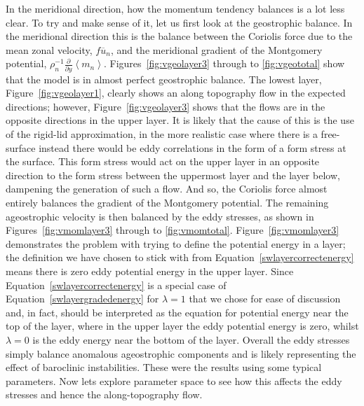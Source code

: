 \documentclass[12pt,a4paper]{report}
\newcommand*\thkmean[1]{\overline{#1}}
\newcommand*\nthkmean[1]{\left\langle{#1}\right\rangle}
\newcommand*\figref[1]{Figure~\ref{#1}}
\newcommand*\equref[1]{Equation~\eqref{#1}}
\newcommand*{\partialdiff}[2][{}]{\frac{\partial #1}{\partial #2}}
\begin{document}
 In the meridional direction, how the momentum tendency balances is a lot
 less clear. To try and make sense of it, let us first look at
 the geostrophic balance. In the meridional direction this
 is the balance between the Coriolis force due to the mean zonal velocity,
 $f\thkmean{u}_{n}$,
 and the meridional gradient of the Montgomery potential,
 $\rho_{n}^{-1}\partialdiff{y}\nthkmean{m_{n}}$. Figures~\ref{fig:vgeolayer3}
 through to \ref{fig:vgeototal} show that the model is in almost perfect
 geostrophic balance. The lowest layer, \figref{fig:vgeolayer1}, clearly shows
 an along topography flow in the expected directions; however, \figref{fig:vgeolayer3}
 shows that the flows are in the opposite directions in the upper layer. 
 It is likely that the cause of this is the use of the rigid-lid approximation,
 in the more realistic case where there is a free-surface instead there would be
 eddy correlations in the form of a form stress at the surface. This form stress 
 would act on the upper layer in an opposite direction to the form stress 
 between the uppermost layer and the layer below, dampening the generation of 
 such a flow. And so, the Coriolis force almost entirely balances the 
 gradient of the Montgomery potential. The remaining ageostrophic velocity
 is then balanced by the eddy stresses, as shown in Figures~\ref{fig:vmomlayer3}
 through to \ref{fig:vmomtotal}. \figref{fig:vmomlayer3} demonstrates
 the problem with trying to define the potential energy in a layer;
 the definition we have chosen to stick with from \equref{swlayercorrectenergy}
 means there is zero eddy potential energy in the upper layer.
 Since \equref{swlayercorrectenergy} is a special case of \equref{swlayergradedenergy} 
 for $\lambda = 1$ that we chose for ease of discussion and, in fact,
 should be interpreted as the equation for potential energy near the top of the layer,
 where in the upper layer the eddy potential energy is zero, whilst 
 $\lambda = 0$ is the eddy energy near the bottom of the layer.
 Overall the eddy
 stresses simply balance anomalous ageostrophic components and is
 likely representing the effect of baroclinic instabilities.
 These were the results using some typical parameters. Now lets explore parameter space
 to see how this affects the eddy stresses and hence the along-topography flow.
  	
\end{document}
